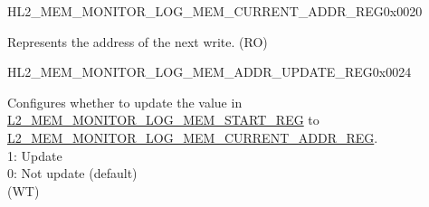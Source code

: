 \begin{register}{H}{L2\_MEM\_MONITOR\_LOG\_MEM\_CURRENT\_ADDR\_REG}{0x0020}\label{regdesc:L2MEMMONITORLOGMEMCURRENTADDRREG}
%
\regnewline%
\begin{regdesc}\begin{reglist}
\label{fielddesc:L2MEMMONITORLOGMEMCURRENTADDR}\item [L2\_MEM\_MONITOR\_LOG\_MEM\_CURRENT\_ADDR] Represents the address of the next write. (RO)
\end{reglist}\end{regdesc}
\end{register}

\begin{register}{H}{L2\_MEM\_MONITOR\_LOG\_MEM\_ADDR\_UPDATE\_REG}{0x0024}\label{regdesc:L2MEMMONITORLOGMEMADDRUPDATEREG}
%
%
\regnewline%
\begin{regdesc}\begin{reglist}
\label{fielddesc:L2MEMMONITORCLRLOGMEMADDRUPDATE}\item [L2\_MEM\_MONITOR\_LOG\_MEM\_ADDR\_UPDATE] Configures whether to update the value in \hyperref[fielddesc:L2MEMMONITORLOGMEMSTART]{L2\_MEM\_MONITOR\_LOG\_MEM\_START\_REG} to \hyperref[fielddesc:L2MEMMONITORLOGMEMCURRENTADDR]{L2\_MEM\_MONITOR\_LOG\_MEM\_CURRENT\_ADDR\_REG}.\\
1: Update\\
0: Not update (default)\\
(WT)
\end{reglist}\end{regdesc}
\end{register}

